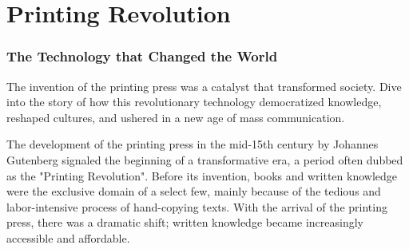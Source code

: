 \chapter{Printing Revolution}
\subsection*{The Technology that Changed the World}
The invention of the printing press was a catalyst that transformed society. Dive into the story of how this revolutionary technology democratized knowledge, reshaped cultures, and ushered in a new age of mass communication.

The development of the printing press in the mid-15th century by Johannes Gutenberg signaled the beginning of a transformative era, a period often dubbed as the "Printing Revolution". Before its invention, books and written knowledge were the exclusive domain of a select few, mainly because of the tedious and labor-intensive process of hand-copying texts. With the arrival of the printing press, there was a dramatic shift; written knowledge became increasingly accessible and affordable.

